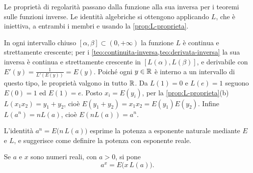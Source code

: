 \begin{schema}
\end{schema}

\begin{strategia}
Le proprietà di regolarità passano dalla funzione alla sua inversa per i teoremi sulle
funzioni inverse. Le identità algebriche si ottengono applicando $L$, che è iniettiva, a
entrambi i membri e usando la \cref{prop:L-proprieta}.
\end{strategia}

\begin{dimostrazione}
In ogni intervallo chiuso $[\alpha,\beta]\subset(0,+\infty)$ la funzione $L$ è continua e strettamente
crescente; per i \cref{teo:continuita-inversa,teo:derivata-inversa} la sua inversa è
continua e strettamente crescente in $[L(\alpha),L(\beta)]$, e derivabile con
$E'(y)=\frac1{L'(E(y))}=E(y)$. Poiché ogni $y\in\mathbb{R}$ è interno a un intervallo di questo tipo,
le proprietà valgono in tutto $\mathbb{R}$. Da $L(1)=0$ e $L(e)=1$ seguono $E(0)=1$ ed $E(1)=e$. Posto
$x_{i}=E(y_{i})$, per la \cref{prop:L-proprieta}(b) $L(x_{1}x_{2})=y_{1}+y_{2}$, cioè
$E(y_{1}+y_{2})=x_{1}x_{2}=E(y_{1})E(y_{2})$. Infine $L(a^{n})=nL(a)$, cioè $E(nL(a))=a^{n}$.
\end{dimostrazione}

L'identità $a^{n}=E\bigl(n\,L(a)\bigr)$ esprime la potenza a esponente naturale mediante
$E$ e $L$, e suggerisce come definire la potenza con esponente reale.

\begin{definizione}\label{def:potenza-integrale}
Se $a$ e $x$ sono numeri reali, con $a>0$, si pone
\begin{equation}\label{eq:potenza-integrale}
  a^{x}=E\bigl(x\,L(a)\bigr) .
\end{equation}
\end{definizione}

